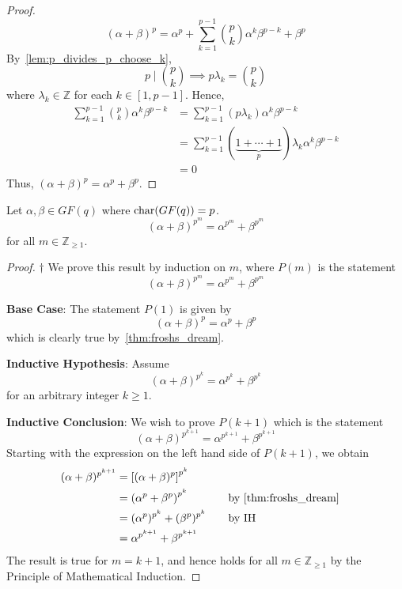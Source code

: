 \begin{proof}
    \[ (\alpha + \beta)^p=\alpha^p+\sum\limits_{k=1}^{p-1}
        \binom{p}{k}\alpha^k\beta^{p-k}+\beta^p \]
    By~\ref{lem:p_divides_p_choose_k},
    \[ p\mid \binom{p}{k}\implies p\lambda_k=\binom{p}{k} \]
    where $ \lambda_k\in\mathbb{Z} $ for each $ k\in[1,p-1] $. Hence,
    \begin{align*}
        \sum\limits_{k=1}^{p-1}\binom{p}{k}\alpha^k\beta^{p-k}
         & = \sum\limits_{k=1}^{p-1} (p\lambda_k) \alpha^k\beta^{p-k}                          \\
         & =\sum\limits_{k=1}^{p-1} (\underbrace{1+\cdots+1}_{p})\lambda_k \alpha^k\beta^{p-k} \\
         & =0
    \end{align*}
    Thus, $ (\alpha + \beta)^p=\alpha^p+\beta^p $.
\end{proof}

\begin{Corollary}{}{}
    Let $ \alpha,\beta\in GF(q) $ where $ \operatorname{char}(GF(q))=p $.
    \[ (\alpha+\beta)^{p^m}=\alpha^{p^m}+\beta^{p^m} \]
    for all $ m\in\mathbb{Z}_{\geqslant 1} $.
\end{Corollary}

\begin{proof} $ \dagger $
    We prove this result by induction on $ m $, where $ P(m) $ is the statement
    \[ (\alpha+\beta)^{p^m}=\alpha^{p^m}+\beta^{p^m} \]

    \textbf{Base Case}: The statement $ P(1) $ is given by
    \[ (\alpha+\beta)^{p}=\alpha^p+\beta^p \]
    which is clearly true by~\ref{thm:froshs_dream}.

    \textbf{Inductive Hypothesis}: Assume
    \[ (\alpha+\beta)^{p^k}=\alpha^{p^k}+\beta^{p^k} \]
    for an arbitrary integer $ k\geqslant 1 $.

    \textbf{Inductive Conclusion}: We wish to prove $ P(k+1) $
    which is the statement
    \[ (\alpha+\beta)^{p^{k+1}}=\alpha^{p^{k+1}}+\beta^{p^{k+1}} \]
    Starting with the expression on the left hand side of $ P(k+1) $,
    we obtain
    \[ \begin{aligned}
            (\alpha+\beta)^{p^{k+1}}
             & =\left[ (\alpha+\beta)^{p} \right]^{p^{k}}                                            \\
             & =\left( \alpha^p+\beta^p \right)^{p^k}     & \quad & \text{by~\ref{thm:froshs_dream}} \\
             & = (\alpha^p)^{p^k}+(\beta^p)^{p^k}         &       & \text{by IH}                     \\
             & =\alpha^{p^{k+1}}+\beta^{p^{k+1}}
        \end{aligned}
    \]
    The result is true for $ m=k+1 $, and hence holds for all $ m\in\mathbb{Z}_{\geqslant 1} $
    by the Principle of Mathematical Induction.
\end{proof}

